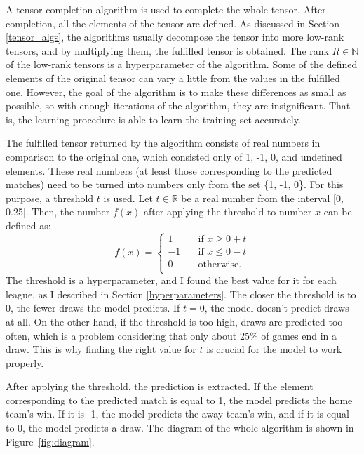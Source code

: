 \documentclass[thesis=M,english]{FITthesis}[2019/12/23]
\begin{document}
A tensor completion algorithm is used to complete the whole tensor. After completion, all the elements of the tensor are defined. As discussed in Section \ref{tensor_algs}, the algorithms usually decompose the tensor into more low-rank tensors, and by multiplying them, the fulfilled tensor is obtained. The rank $R \in \mathbb{N}$ of the low-rank tensors is a hyperparameter of the algorithm. Some of the defined elements of the original tensor can vary a little from the values in the fulfilled one. However, the goal of the algorithm is to make these differences as small as possible, so with enough iterations of the algorithm, they are insignificant. That is, the learning procedure is able to learn the training set accurately.

The fulfilled tensor returned by the algorithm consists of real numbers in comparison to the original one, which consisted only of 1, -1, 0, and undefined elements. These real numbers (at least those corresponding to the predicted matches) need to be turned into numbers only from the set \{1, -1, 0\}. For this purpose, a threshold $t$ is used. Let $t \in \mathbb{R}$ be a real number from the interval [0, 0.25]. Then, the number $f(x)$ after applying the threshold to number $x$ can be defined as:
\[   
f(x) = 
     \begin{cases}
       1 &\quad\text{if } x\ge 0 + t\\
       -1 &\quad\text{if } x\le 0 - t\\
       0 &\quad\text{otherwise.}\\
     \end{cases}
\]
The threshold is a hyperparameter, and I found the best value for it for each league, as I described in Section \ref{hyperparameters}. The closer the threshold is to 0, the fewer draws the model predicts. If $t = 0$, the model doesn't predict draws at all. On the other hand, if the threshold is too high, draws are predicted too often, which is a problem considering that only about 25\% of games end in a draw. This is why finding the right value for $t$ is crucial for the model to work properly.

After applying the threshold, the prediction is extracted. If the element corresponding to the predicted match is equal to 1, the model predicts the home team's win. If it is -1, the model predicts the away team's win, and if it is equal to 0, the model predicts a draw. The diagram of the whole algorithm is shown in Figure~\ref{fig:diagram}.
\end{document}
